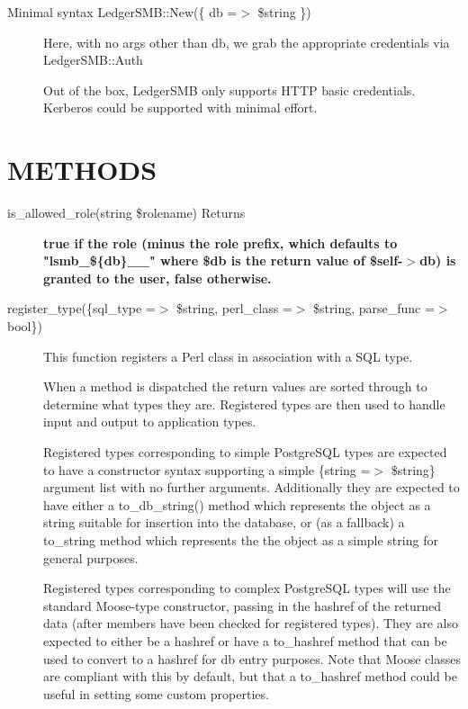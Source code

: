 \begin{description}
\begin{description}
\begin{description}
\begin{description}
\begin{description}
\begin{description}
\begin{description}
\begin{description}
\item[{Minimal syntax LedgerSMB::New(\{ db =$>$ \$string \})}] \mbox{}

Here, with no args other than db, we grab the appropriate credentials via 
LedgerSMB::Auth



Out of the box, LedgerSMB only supports HTTP basic credentials. Kerberos could
be supported with minimal effort.

\end{description}
\section{METHODS\label{METHODS}}
\begin{description}

\item[{is\_allowed\_role(string \$rolename) Returns}] \textbf{true if the role (minus the role prefix, which defaults to "lsmb\_\$\{db\}\_\_" where \$db is the return value of \$self-$>$db) is granted to the user, false otherwise.}
\item[{register\_type(\{sql\_type =$>$ \$string, perl\_class =$>$ \$string, parse\_func =$>$bool\})}] \mbox{}

This function registers a Perl class in association with a SQL type.



When a method is dispatched the return values are sorted through to determine
what types they are.  Registered types are then used to handle input and output
to application types.



Registered types corresponding to simple PostgreSQL types are expected to have a
constructor syntax supporting a simple \{string =$>$ \$string\} argument list with no
further arguments.  Additionally they are expected to have either a
to\_db\_string() method which represents the object as a string suitable for
insertion into the database, or (as a fallback) a to\_string method which
represents the the object as a simple string for general purposes.



Registered types corresponding to complex PostgreSQL types will use the standard
Moose-type constructor, passing in the hashref of the returned data (after
members have been checked for registered types).  They are also expected to
either be a hashref or have a to\_hashref method that can be used to convert to a
hashref for db entry purposes.  Note that Moose classes are compliant with this
by default, but that a to\_hashref method could be useful in setting some custom
properties.




\end{description}
\end{description}
\end{description}
\end{description}
\end{description}
\end{description}
\end{description}
\end{description}
